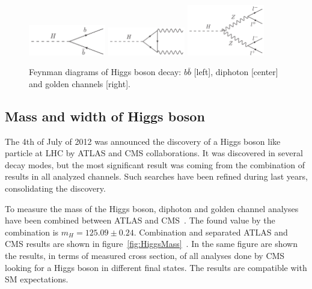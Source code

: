 \begin{figure}[!Hhtbp]
  \begin{center}
    \includegraphics[width=0.3\textwidth]{figs/BB_H.png}
    \includegraphics[width=0.3\textwidth]{figs/Diphoton_H.png}
    \includegraphics[width=0.3\textwidth]{figs/Golden_H.png}
    \caption{Feynman diagrams of Higgs boson decay: $b\bar{b}$ [left], diphoton [center] and golden channels [right].}
    \label{fig:HiggsDecays}
  \end{center}
\end{figure}

\subsection{Mass and width of Higgs boson}

The 4th of July of 2012 was announced the discovery of a Higgs boson like particle at LHC by ATLAS and CMS collaborations. It was discovered in several decay modes, but the most significant result was coming from the combination of results in all analyzed channels. Such searches have been refined during last years, consolidating the discovery. 

To measure the mass of the Higgs boson, diphoton and golden channel analyses have been combined between ATLAS and CMS~\cite{Aad:2015zhl}. The found value by the combination is $m_{H}=125.09\pm 0.24$. Combination and separated ATLAS and CMS results are shown in figure~\ref{fig:HiggsMass}~\cite{Aad:2015zhl,CMS:2014ega,ATLAS-CONF-2015-007}. In the same figure are shown the results, in terms of measured cross section, of all analyses done by CMS looking for a Higgs boson in different final states. The results are compatible with SM expectations.

